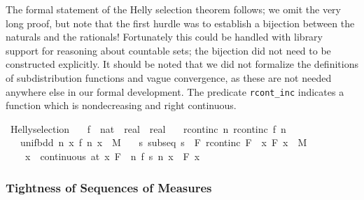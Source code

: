 \documentclass[leqno]{article}
\theoremstyle{definition}
\begin{document}
The formal statement of the Helly selection theorem follows; we omit the very long proof, but note that the first hurdle was to establish a bijection between the naturals and the rationals! Fortunately this could be handled with library support for reasoning about countable sets; the bijection did not need to be constructed explicitly. It should be noted that we did not formalize the definitions of subdistribution functions and vague convergence, as these are not needed anywhere else in our formal development. The predicate \texttt{rcont\_inc} indicates a function which is nondecreasing and right continuous.

\medskip

\begin{isabellebody}
\isamarkupfalse%
\ Helly{\isacharunderscore}selection{\isacharcolon}\isanewline
\ \ \ f\ {\isacharcolon}{\isacharcolon}\ {\isachardoublequoteopen}nat\ {\isasymRightarrow}\ real\ {\isasymRightarrow}\ real{\isachardoublequoteclose}\isanewline
\ \ \ rcont{\isacharunderscore}inc{\isacharcolon}\ {\isachardoublequoteopen}{\isasymAnd}n{\isachardot}\ rcont{\isacharunderscore}inc\ {\isacharparenleft}f\ n{\isacharparenright}{\isachardoublequoteclose}\isanewline
\ \ \ unif{\isacharunderscore}bdd{\isacharcolon}\ {\isachardoublequoteopen}{\isasymforall}n\ x{\isachardot}\ {\isasymbar}f\ n\ x{\isasymbar}\ {\isasymle}\ M{\isachardoublequoteclose}\isanewline
\ \ \ {\isachardoublequoteopen}{\isasymexists}s{\isachardot}\ subseq\ s\ {\isasymand}\ {\isacharparenleft}{\isasymexists}F{\isachardot}\ rcont{\isacharunderscore}inc\ F\ {\isasymand}\ {\isacharparenleft}{\isasymforall}x{\isachardot}\ {\isasymbar}F\ x{\isasymbar}\ {\isasymle}\ M{\isacharparenright}\ {\isasymand}\isanewline
\ \ \ \ {\isacharparenleft}{\isasymforall}x{\isachardot}\ \ continuous\ {\isacharparenleft}at\ x{\isacharparenright}\ F\ {\isasymlongrightarrow}\ {\isacharparenleft}{\isasymlambda}n{\isachardot}\ f\ {\isacharparenleft}s\ n{\isacharparenright}\ x{\isacharparenright}\ {\isacharminus}{\isacharminus}{\isacharminus}{\isacharminus}{\isachargreater}\ F\ x{\isacharparenright}{\isacharparenright}{\isachardoublequoteclose}
\end{isabellebody}

\medskip

\subsubsection{Tightness of Sequences of Measures}
\end{document}
